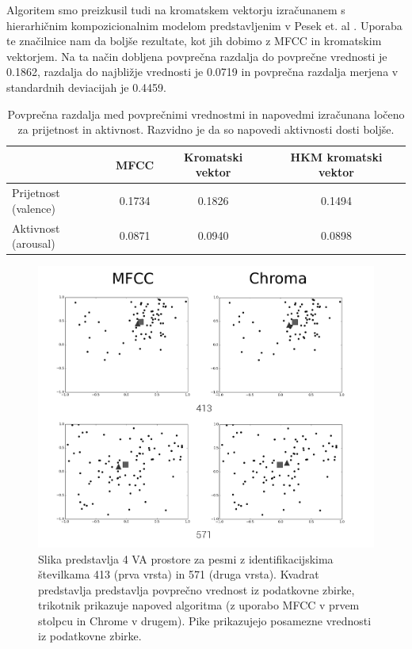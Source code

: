 \documentclass[a4paper, 12pt]{book}
\begin{document}
{Algoritem smo preizkusil tudi na kromatskem vektorju izračunanem s hierarhičnim kompozicionalnim modelom predstavljenim v Pesek et. al \cite{pesek2013chord}. Uporaba te značilnice nam da boljše rezultate, kot jih dobimo z MFCC in kromatskim vektorjem. Na ta način dobljena povprečna razdalja do povprečne vrednosti je 0.1862, razdalja do najbližje vrednosti je 0.0719 in povprečna razdalja merjena v standardnih deviacijah je 0.4459. 

\begin{table}[htb]
\begin{center}
\caption{Povprečna razdalja med povprečnimi vrednostmi in napovedmi izračunana ločeno za prijetnost in aktivnost. Razvidno je da so napovedi aktivnosti dosti boljše. }
\begin{tabular}{|l|c|c|c|}
\hline
 & MFCC & Kromatski vektor & HKM kromatski vektor \\
\hline
Prijetnost (valence) & 0.1734 & 0.1826 & 0.1494\\
Aktivnost (arousal) & 0.0871 & 0.0940 & 0.0898\\
\hline
\end{tabular}
\label{seperateresults}
\end{center}
\end{table}

\begin{figure}[h!bt]
\centering
\includegraphics[width=130mm]{images/graphs1.png}
\caption{Slika predstavlja 4 VA prostore za pesmi z identifikacijskima številkama 413 (prva vrsta) in 571 (druga vrsta). Kvadrat predstavlja predstavlja povprečno vrednost iz podatkovne zbirke, trikotnik prikazuje napoved algoritma (z uporabo MFCC v prvem stolpcu in Chrome v drugem). Pike prikazujejo posamezne vrednosti iz podatkovne zbirke.}
\label{graphs}
\end{figure}

}
\end{document}
